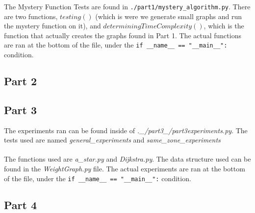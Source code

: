 \documentclass{article}
\begin{document}
The Mystery Function Tests are found in \verb|./part1/mystery_algorithm.py|. There are two functions, $testing()$ (which is were we generate small graphs and run the mystery function on it), and $determiningTimeComplexity()$, which is the function that actually creates the graphs found in Part 1. The actual functions are ran at the bottom of the file, under the \verb|if __name__ == "__main__":| condition.

\subsection{Part 2}

\subsection{Part 3}

The experiments ran can be found inside of \emph{.\_/part3\_/part3experiments.py}. The tests used are named \emph{general\_experiments} and \emph{same\_zone\_experiments} \\
\\
The functions used are \emph{a\_star.py} and \emph{Dijkstra.py}. The data structure used can be found in the \emph{WeightGraph.py} file. The actual experiments are ran at the bottom of the file, under the \verb|if __name__ == "__main__":| condition.

\subsection{Part 4}
\end{document}
